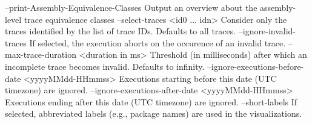     --print-Assembly-Equivalence-Classes                Output an overview about
                                                        the assembly-level trace
                                                        equivalence classes
    --select-traces <id0 ... idn>                       Consider only the traces
                                                        identified by the list
                                                        of trace IDs. Defaults
                                                        to all traces.
    --ignore-invalid-traces                             If selected, the
                                                        execution aborts on the
                                                        occurence of an invalid
                                                        trace.
    --max-trace-duration <duration in ms>               Threshold (in
                                                        milliseconds) after
                                                        which an incomplete
                                                        trace becomes invalid.
                                                        Defaults to infinity.
    --ignore-executions-before-date <yyyyMMdd-HHmmss>   Executions starting
                                                        before this date (UTC
                                                        timezone) are ignored.
    --ignore-executions-after-date <yyyyMMdd-HHmmss>    Executions ending after
                                                        this date (UTC timezone)
                                                        are ignored.
    --short-labels                                      If selected, abbreviated
                                                        labels (e.g., package
                                                        names) are used in the
                                                        visualizations.
